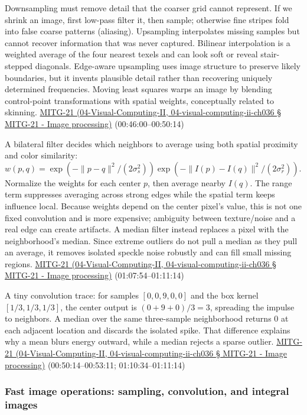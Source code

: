 Downsampling must remove detail that the coarser grid cannot represent. If we shrink an image, first low-pass filter it, then sample; otherwise fine stripes fold into false coarse patterns (aliasing). Upsampling interpolates missing samples but cannot recover information that was never captured. Bilinear interpolation is a weighted average of the four nearest texels and can look soft or reveal stair-stepped diagonals. Edge-aware upsampling uses image structure to preserve likely boundaries, but it invents plausible detail rather than recovering uniquely determined frequencies. Moving least squares warps an image by blending control-point transformations with spatial weights, conceptually related to skinning. \href{}{MITG-21 (04-Visual-Computing-II, 04-visual-computing-ii-ch036 § MITG-21 - Image processing)} (00:46:00--00:50:14)

A bilateral filter decides which neighbors to average using both spatial proximity and color similarity: \(w(p,q)=\exp(-\|p-q\|^2/(2\sigma_s^2))\exp(-\|I(p)-I(q)\|^2/(2\sigma_r^2))\). Normalize the weights for each center \(p\), then average nearby \(I(q)\). The range term suppresses averaging across strong edges while the spatial term keeps influence local. Because weights depend on the center pixel's value, this is not one fixed convolution and is more expensive; ambiguity between texture/noise and a real edge can create artifacts. A median filter instead replaces a pixel with the neighborhood's median. Since extreme outliers do not pull a median as they pull an average, it removes isolated speckle noise robustly and can fill small missing regions. \href{}{MITG-21 (04-Visual-Computing-II, 04-visual-computing-ii-ch036 § MITG-21 - Image processing)} (01:07:54--01:11:14)

A tiny convolution trace: for samples \([0,0,9,0,0]\) and the box kernel \([1/3,1/3,1/3]\), the center output is \((0+9+0)/3=3\), spreading the impulse to neighbors. A median over the same three-sample neighborhood returns \(0\) at each adjacent location and discards the isolated spike. That difference explains why a mean blurs energy outward, while a median rejects a sparse outlier. \href{}{MITG-21 (04-Visual-Computing-II, 04-visual-computing-ii-ch036 § MITG-21 - Image processing)} (00:50:14--00:53:11; 01:10:34--01:11:14)

\subsubsection{Fast image operations: sampling, convolution, and integral images}\label{fast-image-operations-sampling-convolution-and-integral-images}


